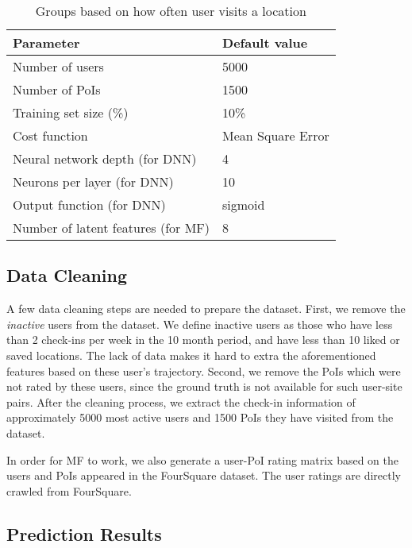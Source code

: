 \begin{table}[htbp]
\begin{center}
\caption{Groups based on how often user visits a location \label{settings}}
\begin{tabular}{|l|l|} \hline
\textbf{Parameter} & \textbf{Default value} \\ \hline
Number of users & 5000  \\ \hline
Number of PoIs & 1500 \\ \hline
Training set size (\%) & 10\% \\ \hline
Cost function & Mean Square Error \\ \hline
Neural network depth (for DNN)& 4 \\ \hline
Neurons per layer (for DNN) & 10 \\ \hline
Output function (for DNN) & sigmoid \\ \hline
Number of latent features (for MF) & 8 \\ \hline
\end{tabular}
\end{center}
\end{table}

\subsection{Data Cleaning}

A few data cleaning steps are needed to prepare the dataset. First, we remove the \textit{inactive} users from the dataset. We define inactive users as those who have less than 2 check-ins per week in the 10 month period, and have less than 10 liked or saved locations. The lack of data makes it hard to extra the aforementioned features based on these user's trajectory. Second, we remove the PoIs which were not rated by these users, since the ground truth is not available for such user-site pairs. After the cleaning process, we extract the check-in information of approximately 5000 most active users and 1500 PoIs they have visited from the dataset.

In order for MF to work, we also generate a user-PoI rating matrix based on the users and PoIs appeared in the FourSquare dataset. The user ratings are directly crawled from FourSquare.


\subsection{Prediction Results}

